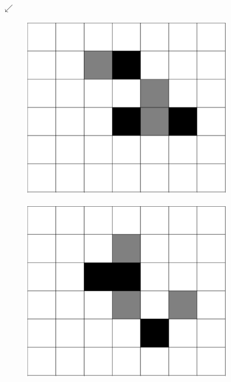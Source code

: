 \documentclass[12pt]{article}
\numberwithin{figure}{section} %
\begin{document}
\begin{figure}[H]
      {\LARGE$\swarrow{}$}
	\begin{subfigure}{0.18\textwidth}
     		\centering
     		\includegraphics[width=\linewidth]{Section4/30.0}
     		\subcaption{}
   	\end{subfigure}
    	\begin{subfigure}{0.18\textwidth}
     		\centering
     		\includegraphics[width=\linewidth]{Section4/30.1}
     		\subcaption{}

\end{subfigure}
\end{figure}
\end{document}
